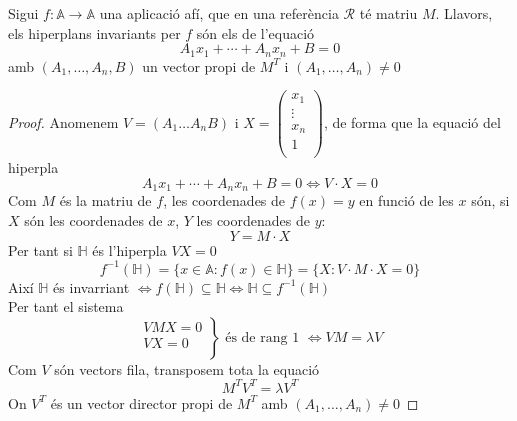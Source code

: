 \begin{prop}
	Sigui $f:\mathbb{A}\to\mathbb{A}$ una aplicació afí, que en una referència $\mathcal{R}$ té matriu $M$. Llavors, els hiperplans invariants per $f$ són els de l'equació
	\[A_1x_1+\dotsb+A_nx_n+B=0\]
	amb $(A_1,\dotsc,A_n,B)$ un vector propi de $M^T$ i $(A_1,\dotsc,A_n)\neq 0$
\end{prop}
\begin{proof}
	Anomenem $V=(A_1 \dotsc A_n B)$ i $X=\left(\begin{array}{c}x_1\\\vdots\\x_n\\1\\\end{array}\right)$, de forma que la equació del hiperpla
	\[A_1x_1+\dotsb+A_nx_n+B=0\iff V\cdot X=0\]
	Com $M$ és la matriu de $f$, les coordenades de $f(x)=y$ en funció de les $x$ són, si $X$ són les coordenades de $x$, $Y$ les coordenades de $y$:
	\[Y=M\cdot X\]
	Per tant si $\mathbb{H}$ és l'hiperpla $VX=0$
	\[f^{-1}(\mathbb{H})=\{x\in\mathbb{A}:f(x)\in\mathbb{H}\}=\{X:V\cdot M\cdot X=0\}\]
	Així $\mathbb{H}$ és invarriant $\iff f(\mathbb{H})\subseteq\mathbb{H}\iff\mathbb{H}\subseteq f^{-1}(\mathbb{H})$ \\
	Per tant el sistema
	\[\left.\begin{array}{r}VMX=0\\VX=0\\\end{array}\right\}\text{ és de rang 1 }\iff VM=\lambda V\]
	Com $V$ són vectors fila, transposem tota la equació
	\[M^TV^T=\lambda V^T\]
	On $V^T$ és un vector director propi de $M^T$ amb $(A_1,\dotsc,A_n)\neq 0$
\end{proof}

